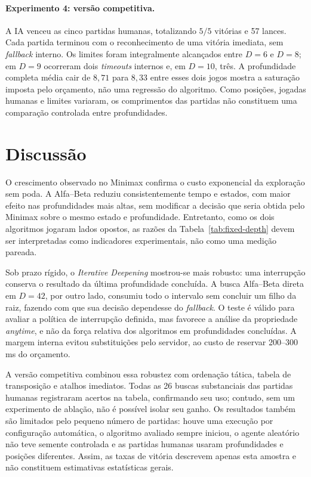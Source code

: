 \documentclass[letterpaper]{article} %
\begin{document}
\paragraph{Experimento 4: versão competitiva.}
A IA venceu as cinco partidas humanas, totalizando $5/5$ vitórias e 57 lances. Cada partida terminou com o reconhecimento de uma vitória imediata, sem \textit{fallback} interno. Os limites foram integralmente alcançados entre $D=6$ e $D=8$; em $D=9$ ocorreram dois \textit{timeouts} internos e, em $D=10$, três. A profundidade completa média cair de $8,71$ para $8,33$ entre esses dois jogos mostra a saturação imposta pelo orçamento, não uma regressão do algoritmo. Como posições, jogadas humanas e limites variaram, os comprimentos das partidas não constituem uma comparação controlada entre profundidades.

\section{Discussão}

O crescimento observado no Minimax confirma o custo exponencial da exploração sem poda. A Alfa--Beta reduziu consistentemente tempo e estados, com maior efeito nas profundidades mais altas, sem modificar a decisão que seria obtida pelo Minimax sobre o mesmo estado e profundidade. Entretanto, como os dois algoritmos jogaram lados opostos, as razões da Tabela~\ref{tab:fixed-depth} devem ser interpretadas como indicadores experimentais, não como uma medição pareada.

Sob prazo rígido, o \textit{Iterative Deepening} mostrou-se mais robusto: uma interrupção conserva o resultado da última profundidade concluída. A busca Alfa--Beta direta em $D=42$, por outro lado, consumiu todo o intervalo sem concluir um filho da raiz, fazendo com que sua decisão dependesse do \textit{fallback}. O teste é válido para avaliar a política de interrupção definida, mas favorece a análise da propriedade \textit{anytime}, e não da força relativa dos algoritmos em profundidades concluídas. A margem interna evitou substituições pelo servidor, ao custo de reservar 200--300\,ms do orçamento.

A versão competitiva combinou essa robustez com ordenação tática, tabela de transposição e atalhos imediatos. Todas as 26 buscas substanciais das partidas humanas registraram acertos na tabela, confirmando seu uso; contudo, sem um experimento de ablação, não é possível isolar seu ganho. Os resultados também são limitados pelo pequeno número de partidas: houve uma execução por configuração automática, o algoritmo avaliado sempre iniciou, o agente aleatório não teve semente controlada e as partidas humanas usaram profundidades e posições diferentes. Assim, as taxas de vitória descrevem apenas esta amostra e não constituem estimativas estatísticas gerais.
\end{document}
